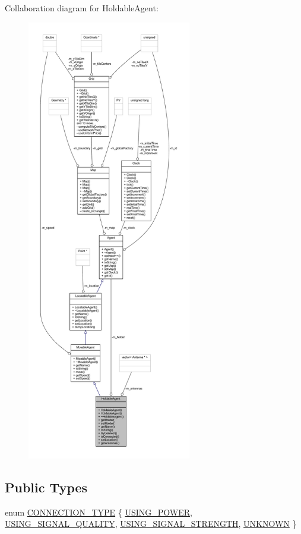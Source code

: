 Collaboration diagram for Holdable\+Agent\+:\nopagebreak
\begin{figure}[H]
\begin{center}
\leavevmode
\includegraphics[height=550pt]{class_holdable_agent__coll__graph}
\end{center}
\end{figure}
\subsection*{Public Types}
\begin{DoxyCompactItemize}
\item 
enum \hyperlink{class_holdable_agent_ae2c334b004d7b9c5a999cf2618e4e518}{C\+O\+N\+N\+E\+C\+T\+I\+O\+N\+\_\+\+T\+Y\+PE} \{ \hyperlink{class_holdable_agent_ae2c334b004d7b9c5a999cf2618e4e518ab8f4a3956d88a54e0aad08e89e203fd6}{U\+S\+I\+N\+G\+\_\+\+P\+O\+W\+ER}, 
\hyperlink{class_holdable_agent_ae2c334b004d7b9c5a999cf2618e4e518a93c5b260edf949c65b96fec443c33f2b}{U\+S\+I\+N\+G\+\_\+\+S\+I\+G\+N\+A\+L\+\_\+\+Q\+U\+A\+L\+I\+TY}, 
\hyperlink{class_holdable_agent_ae2c334b004d7b9c5a999cf2618e4e518ac0a762a4e8fa38dd6285f84aefadd3f4}{U\+S\+I\+N\+G\+\_\+\+S\+I\+G\+N\+A\+L\+\_\+\+S\+T\+R\+E\+N\+G\+TH}, 
\hyperlink{class_holdable_agent_ae2c334b004d7b9c5a999cf2618e4e518a6bdb1529a2032a4648226328e179f552}{U\+N\+K\+N\+O\+WN}
 \}
\end{DoxyCompactItemize}
